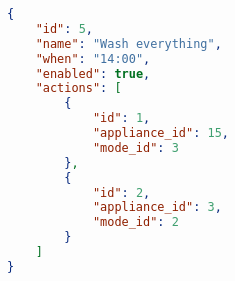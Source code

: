 \begin{lstlisting}[language=json,caption={JSON file describing the fridge.},label=routine_json,float,floatplacement=H]
{
    "id": 5,
    "name": "Wash everything",
    "when": "14:00",
    "enabled": true,
    "actions": [
        {
            "id": 1,
            "appliance_id": 15,
            "mode_id": 3
        },
        {
            "id": 2,
            "appliance_id": 3,
            "mode_id": 2
        }
    ]
}
\end{lstlisting}